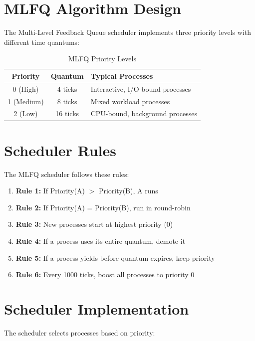 \documentclass[a4paper,12pt]{report}
\begin{document}
\section{MLFQ Algorithm Design}

The Multi-Level Feedback Queue scheduler implements three priority levels with different time quantums:

\begin{table}[H]
\centering
\begin{tabular}{|c|c|p{6cm}|}
\hline
\textbf{Priority} & \textbf{Quantum} & \textbf{Typical Processes} \\
\hline
0 (High) & 4 ticks & Interactive, I/O-bound processes \\
1 (Medium) & 8 ticks & Mixed workload processes \\
2 (Low) & 16 ticks & CPU-bound, background processes \\
\hline
\end{tabular}
\caption{MLFQ Priority Levels}
\label{tab:mlfq_levels}
\end{table}

\section{Scheduler Rules}

The MLFQ scheduler follows these rules:

\begin{enumerate}
    \item \textbf{Rule 1:} If Priority(A) $>$ Priority(B), A runs
    \item \textbf{Rule 2:} If Priority(A) = Priority(B), run in round-robin
    \item \textbf{Rule 3:} New processes start at highest priority (0)
    \item \textbf{Rule 4:} If a process uses its entire quantum, demote it
    \item \textbf{Rule 5:} If a process yields before quantum expires, keep priority
    \item \textbf{Rule 6:} Every 1000 ticks, boost all processes to priority 0
\end{enumerate}

\section{Scheduler Implementation}

The scheduler selects processes based on priority:
\end{document}
